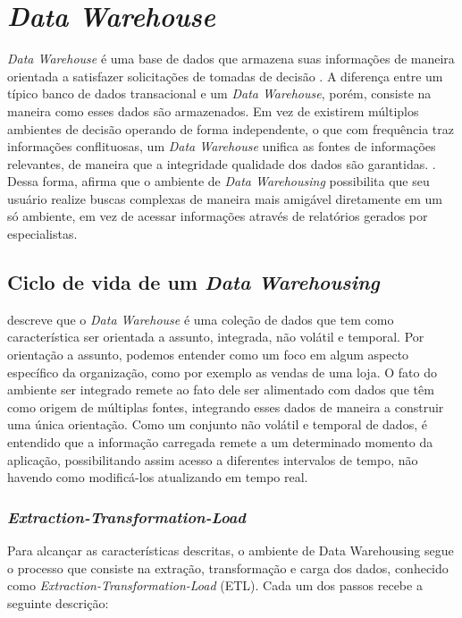 \chapter{\textit{Data Warehouse}} 
\label{chap:arquitetura}

\textit{Data Warehouse} é uma base de dados que armazena suas informações de maneira orientada a satisfazer solicitações de tomadas de decisão \cite{chaudhuri1997}. A diferença entre um típico banco de dados transacional e um  \textit{Data Warehouse}, porém, consiste na maneira como esses dados são armazenados. Em vez de existirem múltiplos ambientes de decisão operando de forma independente, o que com frequência traz informações conflituosas, um \textit{Data Warehouse} unifica as fontes de informações relevantes, de maneira que a integridade  qualidade dos dados são garantidas. \cite{neeraj_sharma_2011}. Dessa forma, afirma que o ambiente de \textit{Data Warehousing} possibilita que seu usuário realize buscas complexas de maneira mais amigável diretamente em um só ambiente, em vez de acessar informações através de relatórios gerados por especialistas. 

\section{Ciclo de vida de um \textit{Data Warehousing}}

 descreve que o \textit{Data Warehouse} é uma coleção de dados que tem como característica ser orientada a assunto, integrada, não volátil e temporal. Por orientação a assunto, podemos entender como um foco em algum aspecto específico da organização, como por exemplo as vendas de uma loja. O fato do ambiente ser integrado remete ao fato dele ser alimentado com dados que têm como origem de múltiplas fontes, integrando esses dados de maneira a construir uma única orientação. Como um conjunto não volátil e temporal de dados, é entendido que a informação carregada remete a um determinado momento da aplicação, possibilitando assim acesso a diferentes intervalos de tempo, não havendo como modificá-los atualizando em tempo real.

\subsection{\textit{Extraction-Transformation-Load}}

 Para alcançar as características descritas, o ambiente de Data Warehousing segue o processo que consiste na extração, transformação e carga dos dados, conhecido como \textit{Extraction-Transformation-Load} (ETL). Cada um dos passos recebe a seguinte descrição:

